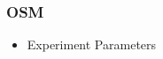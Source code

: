 \begin{frame}
\frametitle{OSM}
\begin{itemize}
	
	\item Experiment Parameters

	
\end{itemize}
\end{frame}
